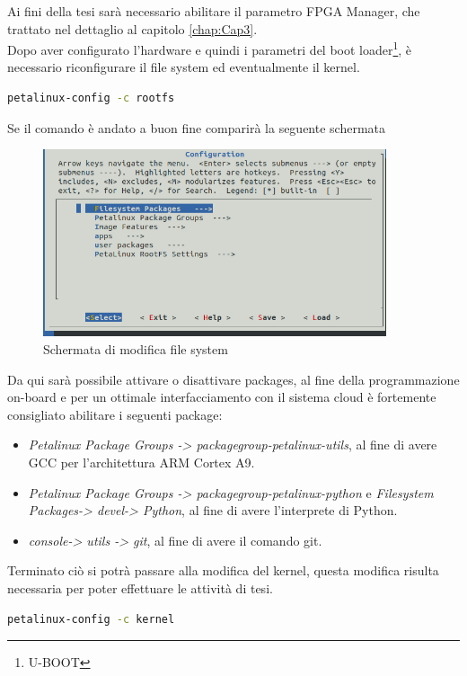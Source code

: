 Ai fini della tesi sarà necessario abilitare il parametro FPGA Manager, che trattato nel dettaglio al capitolo \ref{chap:Cap3}.\\
Dopo aver configurato l'hardware e quindi i parametri del boot loader\footnote{U-BOOT}, è necessario riconfigurare il file system ed eventualmente il kernel.
\begin{lstlisting}[language=sh, label=lst:FileSystem, caption={Comando necessario alla riconfigurazione del file system}]
petalinux-config -c rootfs

\end{lstlisting}
Se il comando è andato a buon fine comparirà la seguente schermata
\begin{figure}[h]
\centering
\includegraphics[width=0.9\textwidth]{images/peta1.png}
\caption{Schermata di modifica file system}
\end{figure}
Da qui sarà possibile attivare o disattivare packages, al fine della programmazione on-board e per un ottimale interfacciamento con il sistema cloud è fortemente consigliato abilitare i seguenti package:
\begin{itemize}
    \item \textit{Petalinux Package Groups -> packagegroup-petalinux-utils}, al fine di avere GCC per l'architettura ARM Cortex A9.
    \item \textit{Petalinux Package Groups -> packagegroup-petalinux-python} e \textit{Filesystem Packages-> devel-> Python}, al fine di avere l'interprete di Python.
    \item \textit{console-> utils -> git}, al fine di avere il comando git.
\end{itemize}
Terminato ciò si potrà passare alla modifica del kernel, questa modifica risulta necessaria per poter effettuare le attività di tesi.
\begin{lstlisting}[language=sh, label=lst:sh, caption={Comando necessario alla riconfigurazione del kernel}]
petalinux-config -c kernel
\end{lstlisting}
